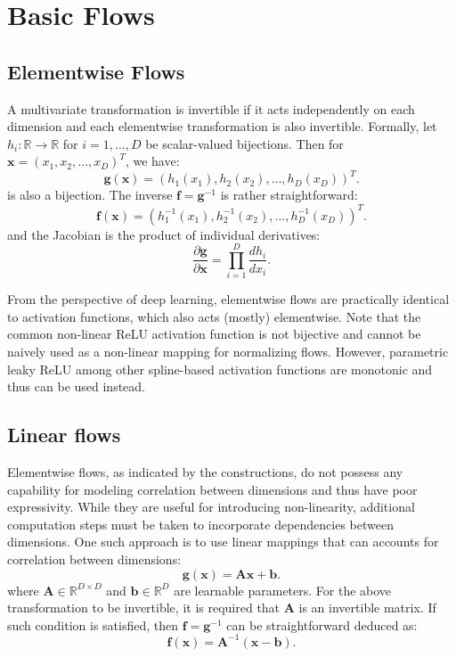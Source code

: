\section{Basic Flows}
\subsection{Elementwise Flows}
A multivariate transformation is invertible if it acts independently on each
dimension and each elementwise transformation is also invertible. Formally, let $h_i:
\mathbb{R} \to \mathbb{R}$ for $i=1,\ldots,D$ be scalar-valued bijections. Then
for $\mathbf{x} = (x_1, x_2, \ldots, x_D)^T$, we have:
$$
\mathbf{g}(\mathbf{x}) = (h_1(x_1), h_2(x_2), \ldots, h_D(x_D))^T
.$$
is also a bijection. The inverse $\mathbf{f} = \mathbf{g}^{-1}$ is rather straightforward:
$$
\mathbf{f}(\mathbf{x}) = (h_1^{-1}(x_1), h_2^{-1}(x_2), \ldots, h_D^{-1}(x_D))^T
.$$
and the Jacobian is the product of individual derivatives:
$$
\frac{\partial \mathbf{g}}{\partial \mathbf{x} } = \prod_{i=1}^D \frac{d h_i}{d x_i}
.$$

From the perspective of deep learning, elementwise flows are practically
identical to activation functions, which also acts (mostly) elementwise.
Note that the common non-linear ReLU activation function is not bijective and
cannot be naively used as a non-linear mapping for normalizing flows. However,
parametric leaky ReLU \citep{xuEmpiricalEvaluationRectified2015} among other spline-based activation functions are monotonic
and thus can be used instead.

\subsection{Linear flows}

Elementwise flows, as indicated by the constructions, do not possess any
capability for modeling correlation between dimensions and thus have poor
expressivity. While they are useful for introducing non-linearity, additional
computation steps must be taken to incorporate dependencies between
dimensions. One such approach is to use linear mappings that can accounts for
correlation between dimensions:
$$
\mathbf{g(x)} = \mathbf{Ax} + \mathbf{b}
.$$
where $\mathbf{A} \in  \mathbb{R}^{D \times D}$ and $\mathbf{b} \in  \mathbb{R}^D$ are
learnable parameters. For the above transformation to be invertible, it is
required that $\mathbf{A}$ is an invertible matrix. If such condition is
satisfied, then $\mathbf{f} = \mathbf{g}^{-1}$ can be straightforward deduced as:
$$
\mathbf{f(x)} = \mathbf{A}^{-1}(\mathbf{x} - \mathbf{b})
.$$

